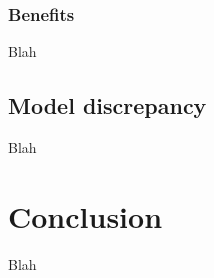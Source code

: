 \documentclass{article}
\begin{document}
\subsubsection{Benefits}
Blah

\subsection{Model discrepancy}
Blah

\section{Conclusion}
Blah















\end{document}
